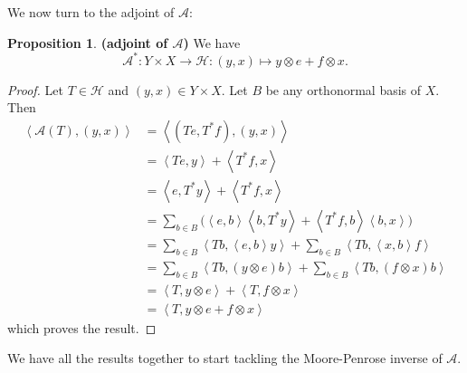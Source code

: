 \documentclass[12pt]{article}
\newcommand{\scal}[2]{\left\langle{#1},{#2}  \right\rangle}
\theoremstyle{definition}
\newtheorem{proposition}[theorem]{Proposition}
\providecommand{\mA}{\mathcal{A}}
\begin{document}
{We now turn to the adjoint of $\mA$: 

\begin{proposition}\textbf{(adjoint of $\mA$)}
\label{p:A^*}
We have 
\begin{equation}
\label{e:A^*}
\mathcal{A}^*\colon {Y}\times {X} \to \mathcal{H}\colon
(y,x)\mapsto y\otimes e + f \otimes x.
\end{equation}
\end{proposition}
\begin{proof}
Let $T\in\mathcal{H}$ and $(y,x)\in Y\times X$.
Let $B$ be any orthonormal basis of $X$.
Then 
\begin{subequations}
\begin{align}
\scal{\mathcal{A}(T)}{(y,x)}
&= \scal{(Te,T^*f)}{(y,x)}\\
&= \scal{Te}{y}+\scal{T^*f}{x}\\
&= \scal{e}{T^*y}+\scal{T^*f}{x}\\
&= \sum_{b\in B}\big(\scal{e}{b}\scal{b}{T^*y}+\scal{T^*f}{b}\scal{b}{x}\big)\\
&= \sum_{b\in B}\scal{Tb}{\scal{e}{b}y}
+\sum_{b\in B}\scal{Tb}{\scal{x}{b}f}\\
&= \sum_{b\in B}\scal{Tb}{(y\otimes e)b}
+\sum_{b\in B}\scal{Tb}{(f\otimes x)b}\\
&= \scal{T}{y\otimes e} + \scal{T}{f\otimes x} \\ 
&= \scal{T}{y\otimes e + f \otimes x}
\end{align}
\end{subequations}
which proves the result. 
\end{proof}

We have all the results together to start tackling 
the Moore-Penrose inverse of $\mA$. 

}
\end{document}
